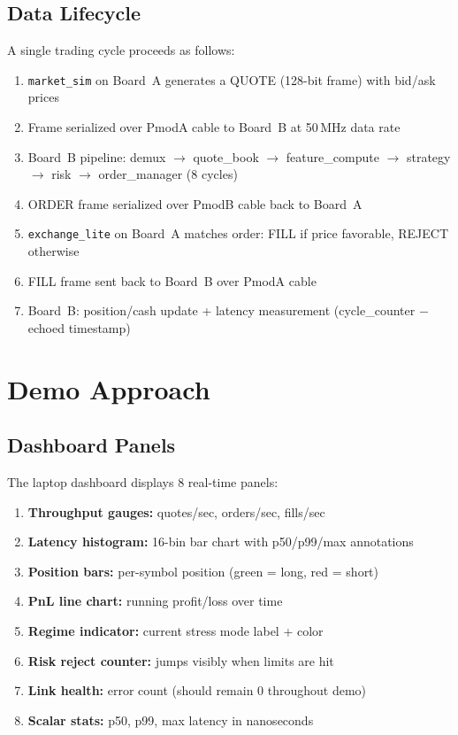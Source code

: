 \documentclass[conference]{IEEEtran}
\begin{document}
\subsection{Data Lifecycle}

A single trading cycle proceeds as follows:
\begin{enumerate}[noitemsep]
  \item \texttt{market\_sim} on Board~A generates a QUOTE (128-bit frame) with bid/ask prices
  \item Frame serialized over PmodA cable to Board~B at 50\,MHz data rate
  \item Board~B pipeline: demux $\rightarrow$ quote\_book $\rightarrow$ feature\_compute $\rightarrow$ strategy $\rightarrow$ risk $\rightarrow$ order\_manager (8 cycles)
  \item ORDER frame serialized over PmodB cable back to Board~A
  \item \texttt{exchange\_lite} on Board~A matches order: FILL if price favorable, REJECT otherwise
  \item FILL frame sent back to Board~B over PmodA cable
  \item Board~B: position/cash update + latency measurement (cycle\_counter $-$ echoed timestamp)
\end{enumerate}

\section{Demo Approach}

\subsection{Dashboard Panels}

The laptop dashboard displays 8 real-time panels:
\begin{enumerate}[noitemsep]
  \item \textbf{Throughput gauges:} quotes/sec, orders/sec, fills/sec
  \item \textbf{Latency histogram:} 16-bin bar chart with p50/p99/max annotations
  \item \textbf{Position bars:} per-symbol position (green = long, red = short)
  \item \textbf{PnL line chart:} running profit/loss over time
  \item \textbf{Regime indicator:} current stress mode label + color
  \item \textbf{Risk reject counter:} jumps visibly when limits are hit
  \item \textbf{Link health:} error count (should remain 0 throughout demo)
  \item \textbf{Scalar stats:} p50, p99, max latency in nanoseconds
\end{enumerate}
\end{document}
